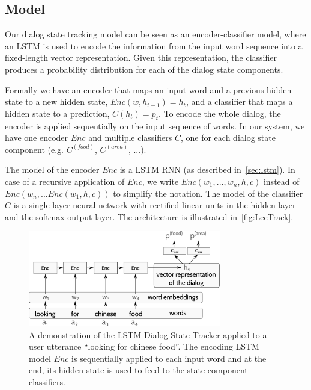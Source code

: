 \documentclass[runningheads,a4paper]{llncs}
\begin{document}
\subsection{Model}
Our dialog state tracking model can be seen as an encoder-classifier model, where an LSTM is used to encode the information from the input word sequence into a fixed-length vector representation. Given this representation, the classifier produces a probability distribution for each of the dialog state components.

Formally we have an encoder that maps an input word and a previous hidden state to a new hidden state, $Enc(w, h_{t-1})=h_t$, and a classifier that maps a hidden state to a prediction, $C(h_t)=p_t$. To encode the whole dialog, the encoder is applied sequentially on the input sequence of words. In our system, we have one encoder $Enc$ and multiple classifiers $C$, one for each dialog state component (e.g. $C^{(food)}$, $C^{(area)}$, ...).

The model of the encoder $Enc$ is a LSTM RNN (as described in~\autoref{sec:lstm}). In case of a recursive application of $Enc$, we write $Enc(w_1, ..., w_n, h, c)$ instead of $Enc(w_n, ... Enc(w_1, h, c))$ to simplify the notation. The model of the classifier $C$ is a single-layer neural network with rectified linear units in the hidden layer and the softmax output layer. The architecture is illustrated in~\autoref{fig:LecTrack}.

\begin{figure}
\center
\includegraphics[width=0.75\textwidth]{arch}
\caption{A demonstration of the LSTM Dialog State Tracker applied to a user utterance ``looking for chinese food''. The encoding LSTM model $Enc$ is sequentially applied to each input word and at the end, its hidden state is used to feed to the state component classifiers.}
\label{fig:LecTrack}
\end{figure}
\end{document}
